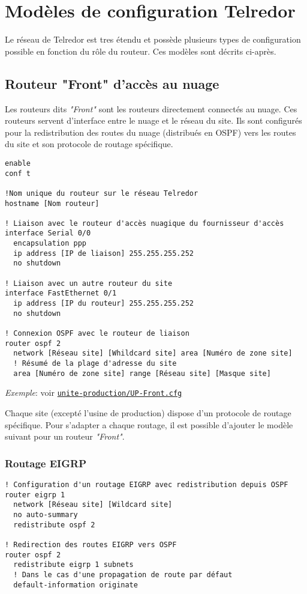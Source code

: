 \documentclass{article}
\newcommand{\tlr}{Telredor\xspace}
\newcommand{\seefile}[1]{
  \begin{center}
  \begin{minipage}{0.9\textwidth}
    \emph{Exemple}: voir \texttt{\href{https://github.com/EpicKiwi/Wide-Network-Project-Cesi-A4/blob/master/network/#1}{#1}}
  \end{minipage}
  \end{center}
}
\begin{document}
\section{Modèles de configuration \tlr}

Le réseau de \tlr est tres étendu et possède plusieurs types de configuration possible en fonction du rôle du routeur.
Ces modèles sont décrits ci-après.

\subsection{Routeur "Front" d'accès au nuage}

Les routeurs dits \emph{"Front"} sont les routeurs directement connectés au nuage.
Ces routeurs servent d'interface entre le nuage et le réseau du site.
Ils sont configurés pour la redistribution des routes du nuage (distribués en OSPF) vers les routes du site et son protocole de routage spécifique.

\begin{lstlisting}[caption=Modèle de configuration d'un routeur "Front"]
enable
conf t

!Nom unique du routeur sur le réseau Telredor
hostname [Nom routeur]

! Liaison avec le routeur d'accès nuagique du fournisseur d'accès
interface Serial 0/0
  encapsulation ppp
  ip address [IP de liaison] 255.255.255.252
  no shutdown

! Liaison avec un autre routeur du site
interface FastEthernet 0/1
  ip address [IP du routeur] 255.255.255.252
  no shutdown

! Connexion OSPF avec le routeur de liaison
router ospf 2
  network [Réseau site] [Whildcard site] area [Numéro de zone site]
  ! Résumé de la plage d'adresse du site
  area [Numéro de zone site] range [Réseau site] [Masque site]
\end{lstlisting}

\seefile{unite-production/UP-Front.cfg}

Chaque site (excepté l'usine de production) dispose d'un protocole de routage spécifique.
Pour s'adapter a chaque routage, il est possible d'ajouter le modèle suivant pour un routeur \emph{"Front"}.

\subsubsection{Routage EIGRP}

\begin{lstlisting}[caption=Configuration d'un routeur "Front" avec EIGRP]
! Configuration d'un routage EIGRP avec redistribution depuis OSPF
router eigrp 1
  network [Réseau site] [Wildcard site]
  no auto-summary
  redistribute ospf 2

! Redirection des routes EIGRP vers OSPF
router ospf 2
  redistribute eigrp 1 subnets
  ! Dans le cas d'une propagation de route par défaut
  default-information originate
\end{lstlisting}
\end{document}
